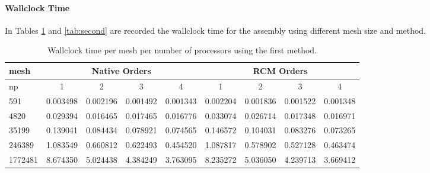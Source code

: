 \documentclass[hidelinks]{article}
\begin{document}
\paragraph{Wallclock Time}
In Tables \ref{tab:first} and \ref{tab:second} are recorded the wallclock time for the assembly using different mesh size and method. 
\begin{table}[H]
    \centering
    \begin{tabular}{|l|cccc|cccc|}
        \hline 
        mesh     & \multicolumn{4}{c|}{Native Orders}            & \multicolumn{4}{c|}{RCM Orders}   \\ \hline
        np       & 1 & 2 & 3 & 4                                 & 1 & 2 & 3 & 4                     \\ \hline
        591      & 0.003498 & 0.002196 & 0.001492 & 0.001343     & 0.002204 & 0.001836 & 0.001522 & 0.001348  \\
        4820     & 0.029394 & 0.016465 & 0.017465 & 0.016776     & 0.033074 & 0.026714 & 0.017348 & 0.016971  \\
        35199    & 0.139041 & 0.084434 & 0.078921 & 0.074565     & 0.146572 & 0.104031 & 0.083276 & 0.073265  \\
        246389   & 1.083549 & 0.660812 & 0.622493 & 0.454520     & 1.087817 & 0.578902 & 0.527128 & 0.463474  \\
        1772481  & 8.674350 & 5.024438 & 4.384249 & 3.763095     & 8.235272 & 5.036050 & 4.239713 & 3.669412  \\ \hline
    \end{tabular}
    \caption{Wallclock time per mesh per number of processors using the first method.}\label{tab:first}
\end{table}
\end{document}
